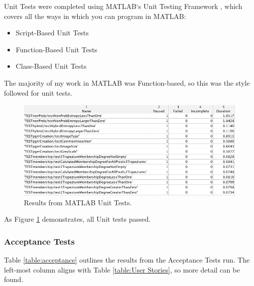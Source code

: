 Unit Tests were completed using MATLAB`s Unit Testing Framework \cite{testing}, which covers all the ways in which you can program in MATLAB:

\begin{itemize}
  \item Script-Based Unit Tests
  \item Function-Based Unit Tests
  \item Class-Based Unit Tests
  \end{itemize}

The majority of my work in MATLAB was Function-based, so this was the style followed for unit tests.

\begin{figure}[H]
  \centering
  \includegraphics[width=\textwidth]{Chapter2/software-img/test-results.png}
  \caption{Results from MATLAB Unit Tests.}
  \label{fig:unit-test-results}
\end{figure}

As Figure \ref{fig:unit-test-results} demonstrates, all Unit tests passed.

\subsubsection{Acceptance Tests}

Table \ref{table:acceptance} outlines the results from the Acceptance Tests run. The left-most column  aligns with Table \ref{table:User Stories}, so more detail can be found.

